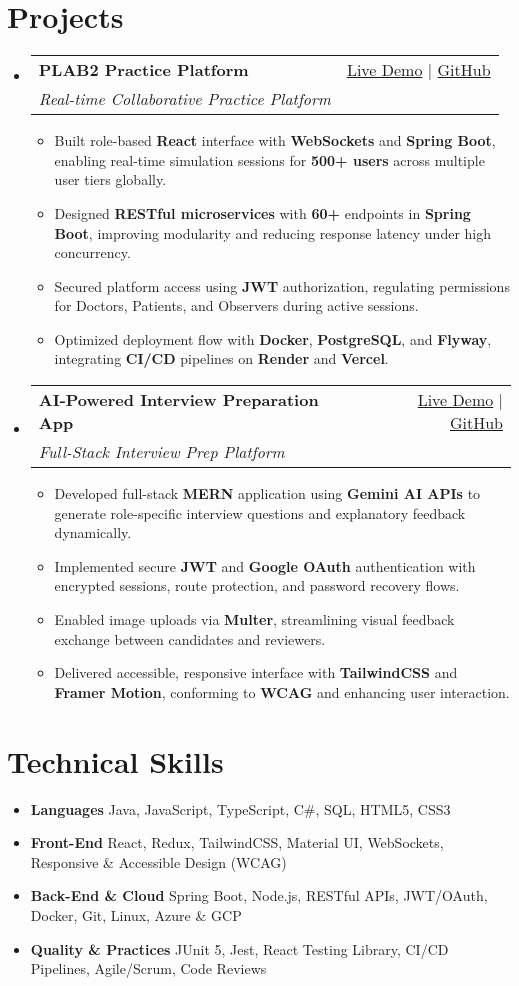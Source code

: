 \documentclass[letterpaper,11pt]{article}
\makeatletter
\newcommand{\resumeItem}[1]{\item\small{#1 \vspace{-2pt}}}
\newcommand{\resumeSubheading}[4]{
  \vspace{-1pt}\item
    \begin{tabular*}{0.97\textwidth}[t]{l@{\extracolsep{\fill}}r}
      \textbf{#1} & #2 \\
      \textit{\small#3} & \textit{\small #4} \\
    \end{tabular*}\vspace{-5pt}
}
\newcommand{\resumeSubHeadingListStart}{\begin{itemize}[leftmargin=*]}
\newcommand{\resumeSubHeadingListEnd}{\end{itemize}}
\newcommand{\resumeItemListStart}{\begin{itemize}}
\newcommand{\resumeItemListEnd}{\end{itemize}\vspace{-5pt}}
\makeatother
\begin{document}
\section{Projects}
  \resumeSubHeadingListStart
    \resumeSubheading
      {\textbf{PLAB2 Practice Platform}}{\href{https://plab2practice.com}{Live Demo} | \href{https://github.com/altansaid/plab2projectnew}{GitHub}}
      {Real-time Collaborative Practice Platform}{}
      \resumeItemListStart
        \resumeItem{Built role-based \textbf{React} interface with \textbf{WebSockets} and \textbf{Spring Boot}, enabling real-time simulation sessions for \textbf{500+ users} across multiple user tiers globally.}
        \resumeItem{Designed \textbf{RESTful microservices} with \textbf{60+} endpoints in \textbf{Spring Boot}, improving modularity and reducing response latency under high concurrency.}
        \resumeItem{Secured platform access using \textbf{JWT} authorization, regulating permissions for Doctors, Patients, and Observers during active sessions.}
        \resumeItem{Optimized deployment flow with \textbf{Docker}, \textbf{PostgreSQL}, and \textbf{Flyway}, integrating \textbf{CI/CD} pipelines on \textbf{Render} and \textbf{Vercel}.}
      \resumeItemListEnd

    \resumeSubheading
      {\textbf{AI-Powered Interview Preparation App}}{\href{https://interviewcoach-ai.vercel.app}{Live Demo} | \href{https://github.com/altansaid/interviewcoach-ai}{GitHub}}
      {Full-Stack Interview Prep Platform}{}
      \resumeItemListStart
        \resumeItem{Developed full-stack \textbf{MERN} application using \textbf{Gemini AI APIs} to generate role-specific interview questions and explanatory feedback dynamically.}
        \resumeItem{Implemented secure \textbf{JWT} and \textbf{Google OAuth} authentication with encrypted sessions, route protection, and password recovery flows.}
        \resumeItem{Enabled image uploads via \textbf{Multer}, streamlining visual feedback exchange between candidates and reviewers.}
        \resumeItem{Delivered accessible, responsive interface with \textbf{TailwindCSS} and \textbf{Framer Motion}, conforming to \textbf{WCAG} and enhancing user interaction.}
      \resumeItemListEnd

  
  \resumeSubHeadingListEnd

\section{Technical Skills}
  \resumeItemListStart
    \resumeItem{\textbf{Languages}}{Java, JavaScript, TypeScript, C\#, SQL, HTML5, CSS3}
    \resumeItem{\textbf{Front-End}}{React, Redux, TailwindCSS, Material UI, WebSockets, Responsive \& Accessible Design (WCAG)}
    \resumeItem{\textbf{Back-End \& Cloud}}{Spring Boot, Node.js, RESTful APIs, JWT/OAuth, Docker, Git, Linux, Azure \& GCP}
    \resumeItem{\textbf{Quality \& Practices}}{JUnit 5, Jest, React Testing Library, CI/CD Pipelines, Agile/Scrum, Code Reviews}
  \resumeItemListEnd
\end{document}
